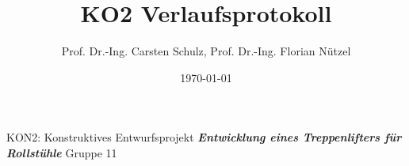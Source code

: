 \documentclass[10pt,a4paper]{article}
\author{{\LARGE Prof. Dr.-Ing. Carsten Schulz, Prof. Dr.-Ing. Florian Nützel}}
\title{\textbf{{\Huge KO2 Verlaufsprotokoll}}}
\date{{\Large \today}}
\begin{document}
\maketitle
\begin{center}
    \Large KON2: Konstruktives Entwurfsprojekt
    \vspace{1cm}
    \textbf{\textit{Entwicklung eines Treppenlifters für Rollstühle}}
    \vspace{1cm}
    {\Large Gruppe 11}
\end{center}
\end{document}
